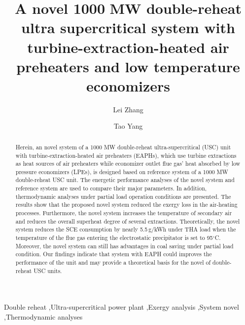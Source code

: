 \documentclass[preprint,12pt]{elsarticle}
\begin{document}
\begin{frontmatter}



\title{A novel 1000\,\,MW double-reheat ultra supercritical system with turbine-extraction-heated air preheaters and low temperature economizers}


\author[hust,ncst]{Lei Zhang}
\author[hust]{Tao Yang}

\address[hust]{School of Energy and Power Engineering, Huazhong University of Science and Technology, Wuhan 430074,China}
\address[ncst]{College of Metallurgy and Energy, NorthChina University of Scienceand and Technology, Tangshan 063009,China}

\begin{abstract}
Herein, an novel system of a 1000\,\,MW double-reheat ultra-supercritical (USC) unit with turbine-extraction-heated air preheaters (EAPHs), which use turbine extractions as heat sources of air preheaters while economizer outlet flue gas’ heat absorbed by low pressure economizers (LPEs), is designed based on reference system of a 1000\,\,MW double-reheat USC unit. 
The energetic performance analyses of the novel system and reference system are used to compare their major parameters. 
In addition, thermodynamic analyses under partial load operation conditions are presented. 
The results show that the proposed novel system reduced the exergy loss in the air-heating processes. Furthermore, the novel system increases the temperature of secondary air and reduces the overall superheat degree of several extractions.
 Theoretically, the novel system reduces the SCE consumption by nearly 5.5\,g/kWh under THA load when the temperature of the flue gas entering the electrostatic precipitator is set to 95$^\circ$C.
 Moreover, the novel system can still has advantages in coal saving under partial load condition.
 Our findings indicate that system with EAPH could improves the performance of the unit and may provide a theoretical basis for the novel of double-reheat USC units.
\end{abstract}

\begin{keyword}
Double reheat \sep Ultra-supercritical power plant \sep Exergy analysis \sep System novel \sep Thermodynamic analyses
\end{keyword}

\end{frontmatter}
\end{document}
